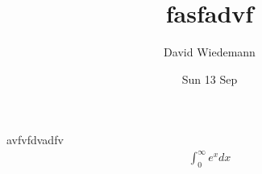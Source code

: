 
\title{fasfadvf}
\author{David Wiedemann}
\date{Sun 13 Sep}

\maketitle
avfvfdvadfv
\begin{align*}
\int_{0}^{\infty } e^{x} dx
\end{align*}


